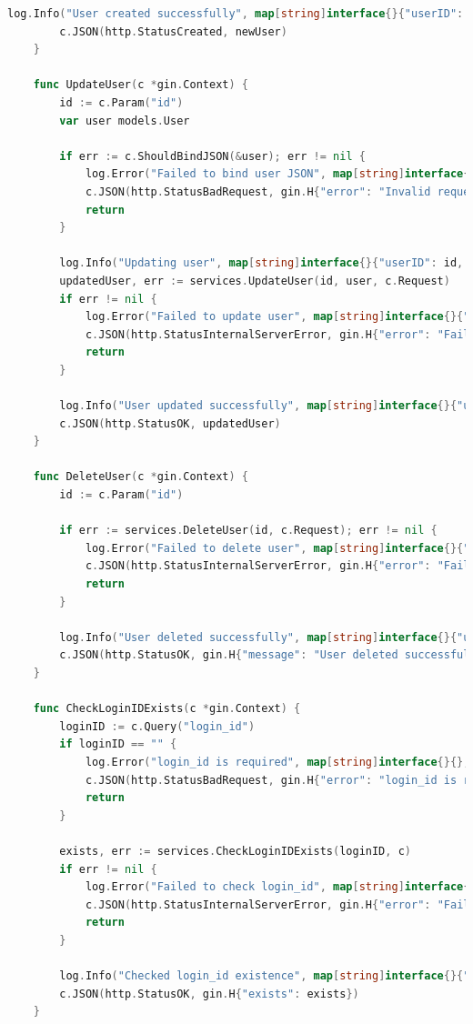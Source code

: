 \begin{lstlisting}[language=Go, frame=single]
		log.Info("User created successfully", map[string]interface{}{"userID": newUser.ID}, c)
		c.JSON(http.StatusCreated, newUser)
	}
	
	func UpdateUser(c *gin.Context) {
		id := c.Param("id")
		var user models.User
	
		if err := c.ShouldBindJSON(&user); err != nil {
			log.Error("Failed to bind user JSON", map[string]interface{}{"error": err.Error()}, c)
			c.JSON(http.StatusBadRequest, gin.H{"error": "Invalid request payload"})
			return
		}
	
		log.Info("Updating user", map[string]interface{}{"userID": id, "user": user}, c)
		updatedUser, err := services.UpdateUser(id, user, c.Request)
		if err != nil {
			log.Error("Failed to update user", map[string]interface{}{"userID": id, "error": err.Error()}, c)
			c.JSON(http.StatusInternalServerError, gin.H{"error": "Failed to update user"})
			return
		}
	
		log.Info("User updated successfully", map[string]interface{}{"userID": updatedUser.ID}, c)
		c.JSON(http.StatusOK, updatedUser)
	}
	
	func DeleteUser(c *gin.Context) {
		id := c.Param("id")
	
		if err := services.DeleteUser(id, c.Request); err != nil {
			log.Error("Failed to delete user", map[string]interface{}{"userID": id, "error": err.Error()}, c)
			c.JSON(http.StatusInternalServerError, gin.H{"error": "Failed to delete user"})
			return
		}
	
		log.Info("User deleted successfully", map[string]interface{}{"userID": id}, c)
		c.JSON(http.StatusOK, gin.H{"message": "User deleted successfully"})
	}
	
	func CheckLoginIDExists(c *gin.Context) {
		loginID := c.Query("login_id")
		if loginID == "" {
			log.Error("login_id is required", map[string]interface{}{}, c)
			c.JSON(http.StatusBadRequest, gin.H{"error": "login_id is required"})
			return
		}
	
		exists, err := services.CheckLoginIDExists(loginID, c)
		if err != nil {
			log.Error("Failed to check login_id", map[string]interface{}{"error": err.Error()}, c)
			c.JSON(http.StatusInternalServerError, gin.H{"error": "Failed to check login_id"})
			return
		}
	
		log.Info("Checked login_id existence", map[string]interface{}{"login_id": loginID, "exists": exists}, c)
		c.JSON(http.StatusOK, gin.H{"exists": exists})
	}
	
\end{lstlisting}